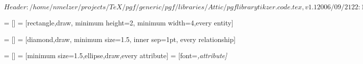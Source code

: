 \ProvidesPackageRCS[v\pgfversion] $Header: /home/nmelzer/projects/TeX/pgf/generic/pgf/libraries/Attic/pgflibrarytikzer.code.tex,v 1.1 2006/09/21 22:17:12 tantau Exp $

%




=           []
=                 [rectangle,draw,
                                     minimum height=2\baselineskip,
                                     minimum width=4\baselineskip,every entity]



=     []
=           [diamond,draw,
                                     minimum size=1.5\baselineskip,
                                     inner sep=1pt,
                                     every relationship]



=        []
=              [minimum size=1.5\baselineskip,ellipse,draw,every attribute]
=          [font=\itshape,attribute]




\endinput
